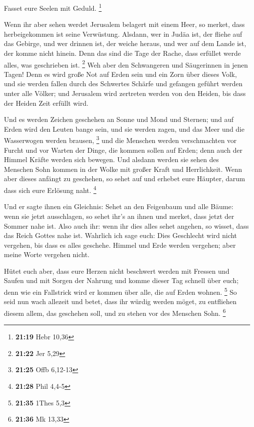  Fasset eure Seelen mit Geduld. \footnote{\textbf{21:19}
  Hebr 10,36}

 Wenn ihr aber sehen werdet Jerusalem belagert mit einem
Heer, so merket, dass herbeigekommen ist seine Verwüstung. 
Alsdann, wer in Judäa ist, der fliehe auf das Gebirge, und wer drinnen
ist, der weiche heraus, und wer auf dem Lande ist, der komme nicht
hinein.  Denn das sind die Tage der Rache, dass erfüllet
werde alles, was geschrieben ist. \footnote{\textbf{21:22} Jer 5,29}
 Weh aber den Schwangeren und Säugerinnen in jenen Tagen!
Denn es wird große Not auf Erden sein und ein Zorn über dieses Volk,
 und sie werden fallen durch des Schwertes Schärfe und
gefangen geführt werden unter alle Völker; und Jerusalem wird zertreten
werden von den Heiden, bis dass der Heiden Zeit erfüllt wird.

 Und es werden Zeichen geschehen an Sonne und Mond und
Sternen; und auf Erden wird den Leuten bange sein, und sie werden zagen,
und das Meer und die Wasserwogen werden brausen, \footnote{\textbf{21:25}
  Offb 6,12-13}  und die Menschen werden verschmachten vor
Furcht und vor Warten der Dinge, die kommen sollen auf Erden; denn auch
der Himmel Kräfte werden sich bewegen.  Und alsdann werden
sie sehen des Menschen Sohn kommen in der Wolke mit großer Kraft und
Herrlichkeit.  Wenn aber dieses anfängt zu geschehen, so
sehet auf und erhebet eure Häupter, darum dass sich eure Erlösung naht.
\footnote{\textbf{21:28} Phil 4,4-5}

 Und er sagte ihnen ein Gleichnis: Sehet an den Feigenbaum
und alle Bäume:  wenn sie jetzt ausschlagen, so sehet ihr's
an ihnen und merket, dass jetzt der Sommer nahe ist.  Also
auch ihr: wenn ihr dies alles sehet angehen, so wisset, dass das Reich
Gottes nahe ist.  Wahrlich ich sage euch: Dies Geschlecht
wird nicht vergehen, bis dass es alles geschehe.  Himmel
und Erde werden vergehen; aber meine Worte vergehen nicht.

 Hütet euch aber, dass eure Herzen nicht beschwert werden
mit Fressen und Saufen und mit Sorgen der Nahrung und komme dieser Tag
schnell über euch;  denn wie ein Fallstrick wird er kommen
über alle, die auf Erden wohnen. \footnote{\textbf{21:35} 1Thes 5,3}
 So seid nun wach allezeit und betet, dass ihr würdig
werden möget, zu entfliehen diesem allem, das geschehen soll, und zu
stehen vor des Menschen Sohn. \footnote{\textbf{21:36} Mk 13,33}

